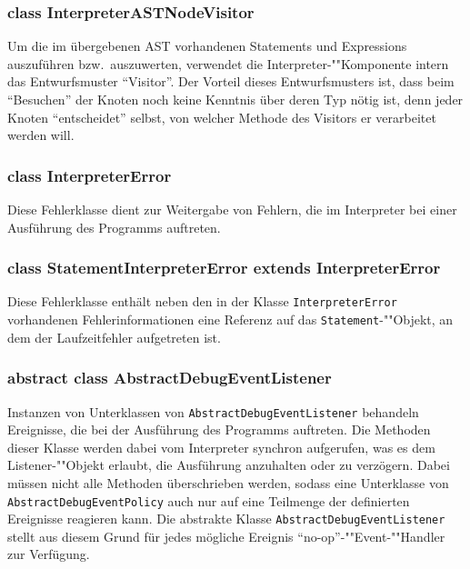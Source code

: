 \subsubsection{class InterpreterASTNodeVisitor}
Um die im übergebenen AST vorhandenen Statements und Expressions auszuführen bzw.\ auszuwerten, verwendet die Interpreter-""Komponente intern das Entwurfsmuster ``Visitor''. Der Vorteil dieses Entwurfsmusters ist, dass beim ``Besuchen'' der Knoten noch keine Kenntnis über deren Typ nötig ist, denn jeder Knoten ``entscheidet'' selbst, von welcher Methode des Visitors er verarbeitet werden will.

\subsubsection{class InterpreterError}
Diese Fehlerklasse dient zur Weitergabe von Fehlern, die im Interpreter bei einer Ausführung des Programms auftreten.

\subsubsection{class StatementInterpreterError extends InterpreterError}
Diese Fehlerklasse enthält neben den in der Klasse \texttt{InterpreterError} vorhandenen Fehlerinformationen eine Referenz auf das \texttt{Statement}-""Objekt, an dem der Laufzeitfehler aufgetreten ist.

\subsubsection{abstract class AbstractDebugEventListener}
Instanzen von Unterklassen von \texttt{AbstractDebugEventListener} behandeln Ereignisse, die bei der Ausführung des Programms auftreten. Die Methoden dieser Klasse werden dabei vom Interpreter synchron aufgerufen, was es dem Listener-""Objekt erlaubt, die Ausführung anzuhalten oder zu verzögern. Dabei müssen nicht alle Methoden überschrieben werden, sodass eine Unterklasse von \texttt{AbstractDebugEventPolicy} auch nur auf eine Teilmenge der definierten Ereignisse reagieren kann. Die abstrakte Klasse \texttt{AbstractDebugEventListener} stellt aus diesem Grund für jedes mögliche Ereignis ``no-op''-""Event-""Handler zur Verfügung.


